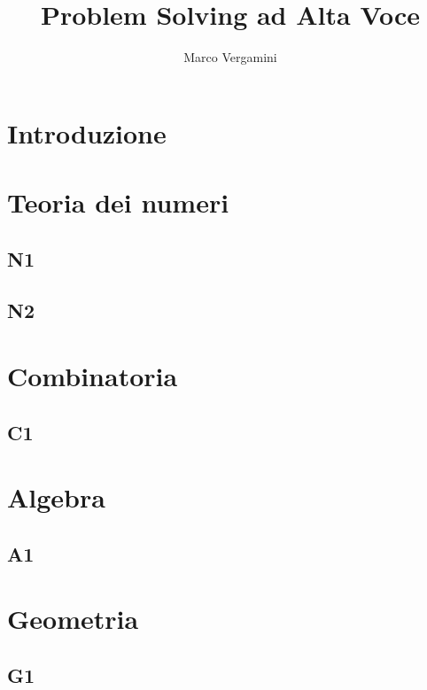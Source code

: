 \documentclass{article}
\title{Problem Solving ad Alta Voce}
\date{}
\author{Marco Vergamini}
\begin{document}
\maketitle
\newpage
\tableofcontents
\newpage


\section*{Introduzione}


\newpage

\section{Teoria dei numeri}

\subsection{N1}


\subsection{N2}


\newpage

\section{Combinatoria}

\subsection{C1}


\newpage

\section{Algebra}

\subsection{A1}


\newpage

\section{Geometria}

\subsection{G1}

\end{document}
